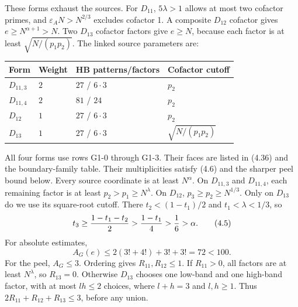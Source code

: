 These forms exhaust the sources.
For $D_{11}$, $5\lambda>1$ allows at most two cofactor primes,
and $\varepsilon_A N>N^{2/3}$ excludes cofactor 1.
A composite $D_{12}$ cofactor gives $e\ge N^{\alpha+1}>N$.
Two $D_{13}$ cofactor factors give $e\ge N$, because each factor is at least $\sqrt{N/(p_1p_2)}$.
The linked source parameters are:
\begin{center}
\begin{tabular}{@{}llll@{}}
\toprule
Form & Weight & HB patterns/factors & Cofactor cutoff \\
\midrule
$D_{11,3}$ & $2$ & $27$ / $6\cdot3$ & $p_2$ \\
$D_{11,4}$ & $2$ & $81$ / $24$ & $p_2$ \\
$D_{12}$ & $1$ & $27$ / $6\cdot3$ & $p_2$ \\
$D_{13}$ & $1$ & $27$ / $6\cdot3$ & $\sqrt{N/(p_1p_2)}$ \\
\bottomrule
\end{tabular}
\end{center}
All four forms use rows G1-0 through G1-3.
Their faces are listed in (4.36) and the boundary-family table.
Their multiplicities satisfy (4.6) and the sharper peel bound below.
Every source coordinate is at least $N^\alpha$.
On $D_{11,3}$ and $D_{11,4}$, each remaining factor is at least
$p_2>p_1\ge N^\lambda$.
On $D_{12}$, $p_3\ge p_2\ge N^{1/3}$.
Only on $D_{13}$ do we use its square-root cutoff. There
$t_2<(1-t_1)/2$ and $t_1<\lambda<1/3$, so
\[
 t_3\ge {1-t_1-t_2\over2}>{1-t_1\over4}>
 {1\over6}>\alpha.
 \tag{4.5}
\]
For absolute estimates,
\[
 A_G(e)\le2(3!+4!)+3!+3!=72<100.
 \tag{4.6}
\]
For the peel, $A_G\le3$.
Ordering gives $R_{11},R_{12}\le1$.
If $R_{11}>0$, all factors are at least $N^\lambda$, so $R_{13}=0$.
Otherwise $D_{13}$ chooses one low-band and one high-band factor,
with at most $lh\le2$ choices, where $l+h=3$ and $l,h\ge1$.
Thus $2R_{11}+R_{12}+R_{13}\le3$, before any union.

